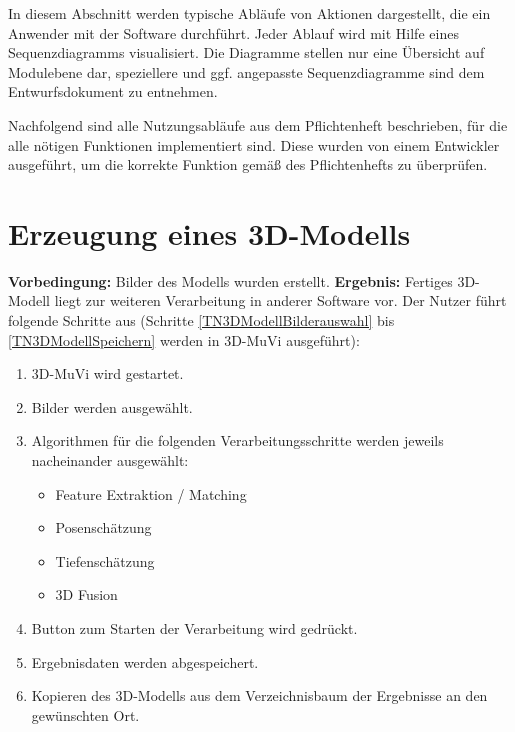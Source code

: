 In diesem Abschnitt werden typische Abläufe von Aktionen dargestellt, die ein Anwender mit der Software durchführt. Jeder Ablauf wird mit Hilfe eines Sequenzdiagramms visualisiert. Die Diagramme stellen nur eine Übersicht auf Modulebene dar, speziellere und ggf. angepasste Sequenzdiagramme sind dem Entwurfsdokument zu entnehmen.
\par
Nachfolgend sind alle Nutzungsabläufe aus dem Pflichtenheft beschrieben, für die alle nötigen Funktionen implementiert sind. Diese wurden von einem Entwickler ausgeführt, um die korrekte Funktion gemäß des Pflichtenhefts zu überprüfen.

\section{Erzeugung eines 3D-Modells}
\textbf{Vorbedingung:} Bilder des Modells wurden erstellt. \newline
\textbf{Ergebnis:} Fertiges 3D-Modell liegt zur weiteren Verarbeitung in anderer Software vor. \newline
Der Nutzer führt folgende Schritte aus (Schritte \ref{TN3DModellBilderauswahl} bis \ref{TN3DModellSpeichern} werden in 3D-MuVi ausgeführt):
\begin{enumerate}
	\item 3D-MuVi wird gestartet.
	\item \label{TN3DModellBilderauswahl} Bilder werden ausgewählt.
	\item Algorithmen für die folgenden Verarbeitungsschritte werden jeweils nacheinander ausgewählt:
	\begin{itemize}
		\item Feature Extraktion / Matching
		\item Posenschätzung
		\item Tiefenschätzung
		\item 3D Fusion
	\end{itemize}
	\item Button zum Starten der Verarbeitung wird gedrückt.
	\item \label{TN3DModellSpeichern} Ergebnisdaten werden abgespeichert.
	\item Kopieren des 3D-Modells aus dem Verzeichnisbaum der Ergebnisse an den gewünschten Ort.
\end{enumerate}
